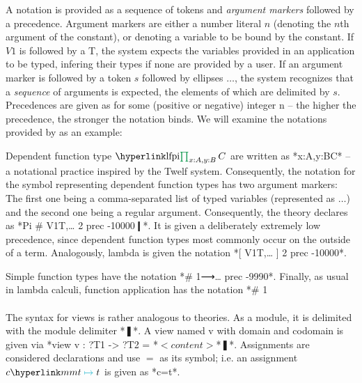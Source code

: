 A notation is provided as a sequence of tokens and \emph{argument markers} followed by a precedence. Argument markers are either a number literal $n$ (denoting the $n$th argument of the constant), or  denoting a variable to be bound by the constant. If $V1$ is followed by a \cn T, the system expects the variables provided in an application to be typed, infering their types if none are provided by a user. If an argument marker is followed by a token $s$ followed by ellipses $\ldots$, the system recognizes that a \emph{sequence} of arguments is expected, the elements of which are delimited by $s$. Precedences are given as  for some (positive or negative) integer \cn n -- the higher the precedence, the stronger the notation binds. We will examine the notations provided by \LF as an example:

Dependent function type $\lfpi{x:A,y:B}C$ are written as *{x:A,y:B}C* -- a notational practice inspired by the Twelf system. Consequently, the notation for the symbol  representing dependent function types has two argument markers: The first one being a comma-separated list of typed variables (represented as $\ldots$) and the second one being a regular argument. Consequently, the theory  declares  as *Pi # { V1T,… } 2 prec -10000❙*. It is given a deliberately extremely low precedence, since dependent function types most commonly occur on the outside of a term. Analogously, lambda is given the notation *[ V1T,… ] 2 prec -10000*.

Simple function types have the notation *# 1⟶… prec  -9990*. Finally, as usual in lambda calculi, function application has the notation *# 1%

\paragraph{} The syntax for views is rather analogous to theories. As a module, it is delimited with the module delimiter *❚*. A view named \cn v with domain  and codomain  is given via *view v : ?T1 -> ?T2 = *$<content>$*❚*. Assignments are considered declarations and use $=$ as its symbol; i.e. an assignment $c\mmtass t$ is given as *c=t*.


\lstDeleteShortInline*